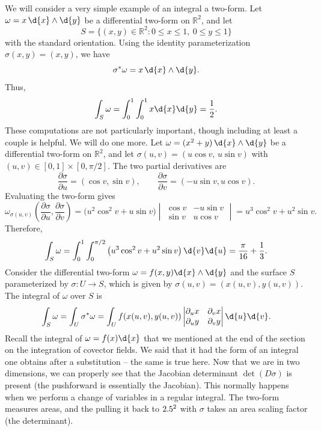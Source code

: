 \documentclass[a4paper,12pt]{article}
\begin{document}
We will consider a very simple example of an integral a two-form.
Let $\omega = x\,\d{x} \wedge \d{y}$ be a differential two-form on $\mathbb{R}^2$, and let
\begin{equation*}
S = \{(x,y)\in\mathbb{R}^2 : 0 \le x \le 1,\ 0 \le y \le 1\}
\end{equation*}
with the standard orientation.
Using the identity parameterization $\sigma(x,y) = (x,y)$, we have
\begin{equation*}
\sigma^*\omega = x\,\d{x}\wedge\d{y}.
\end{equation*}
Thus,
\begin{equation*}
\int_S \omega = \int_0^1 \int_0^1 x \d{x}\d{y} = \frac{1}{2}.
\end{equation*}
These computations are not particularly important, though including at least a couple is helpful.
We will do one more.
Let $\omega = (x^2 + y)\,\d{x} \wedge \d{y}$ be a differential two-form on $\mathbb{R}^2$, and let $\sigma(u,v) = (u\cos v,\, u\sin v)$ with $(u,v) \in [0,1]\times[0,\pi/2]$.
The two partial derivatives are
\begin{equation*}
\frac{\partial \sigma}{\partial u} = (\cos v, \sin v), \qquad \frac{\partial \sigma}{\partial v} = (-u\sin v, u\cos v).
\end{equation*}
Evaluating the two-form gives
\begin{equation*}
\omega_{\sigma(u,v)} \left(\frac{\partial \sigma}{\partial u},\frac{\partial \sigma}{\partial v}\right)
= \bigl(u^2\cos^2 v + u\sin v\bigr)
\begin{vmatrix}
\cos v & -u\sin v \\
\sin v & u\cos v
\end{vmatrix}
= u^3\cos^2 v + u^2\sin v.
\end{equation*}
Therefore,
\begin{equation*}
\int_S \omega = \int_0^1 \int_0^{\pi/2} \left( u^3\cos^2 v + u^2\sin v \right)\d{v}\d{u} = \frac{\pi}{16} + \frac{1}{3}.
\end{equation*}
Consider the differential two-form $\omega = f(x,y) \d{x} \wedge \d{y}$ and the surface $S$ parameterized by $\sigma \colon U \to S$, which is given by $\sigma(u, v) = (x(u, v), y(u, v))$.
The integral of $\omega$ over $S$ is
\begin{equation*}
    \int_S \omega = \int_U \sigma^*\omega = \int_U f(x(u, v), y(u, v))
    \begin{vmatrix}
        \partial_u x & \partial_v x \\
        \partial_u y & \partial_v y
    \end{vmatrix} \d{u}\d{v}.
\end{equation*}
Recall the integral of $\omega = f(x) \d{x}$ that we mentioned at the end of the section on the integration of covector fields.
We said that it had the form of an integral one obtains after a substitution -- the same is true here.
Now that we are in two dimensions, we can properly see that the Jacobian determinant $\det(D\sigma)$ is present (the pushforward is essentially the Jacobian).
This normally happens when we perform a change of variables in a regular integral.
The two-form measures areas, and the pulling it back to $2.5^2$ with $\sigma$ takes an area scaling factor (the determinant).
\end{document}

